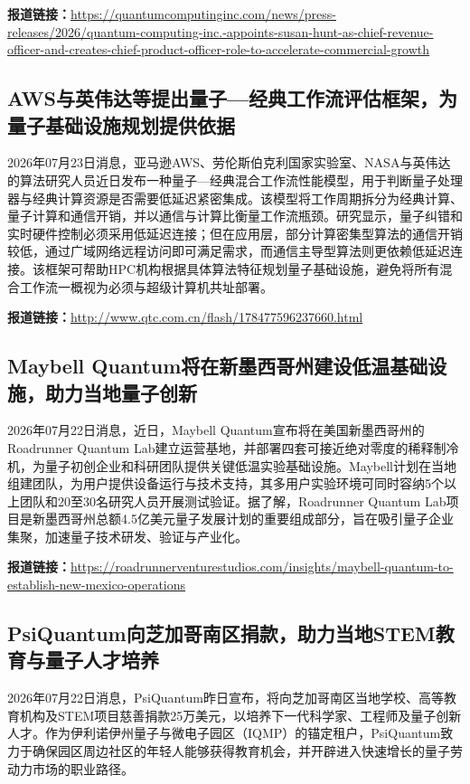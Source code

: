 \documentclass[12pt,a4paper]{ctexart}
\begin{document}
\noindent\textbf{报道链接：}\url{https://quantumcomputinginc.com/news/press-releases/2026/quantum-computing-inc.-appoints-susan-hunt-as-chief-revenue-officer-and-creates-chief-product-officer-role-to-accelerate-commercial-growth}

\subsection{ AWS与英伟达等提出量子—经典工作流评估框架，为量子基础设施规划提供依据 }

2026年07月23日消息，亚马逊AWS、劳伦斯伯克利国家实验室、NASA与英伟达的算法研究人员近日发布一种量子—经典混合工作流性能模型，用于判断量子处理器与经典计算资源是否需要低延迟紧密集成。该模型将工作周期拆分为经典计算、量子计算和通信开销，并以通信与计算比衡量工作流瓶颈。研究显示，量子纠错和实时硬件控制必须采用低延迟连接；但在应用层，部分计算密集型算法的通信开销较低，通过广域网络远程访问即可满足需求，而通信主导型算法则更依赖低延迟连接。该框架可帮助HPC机构根据具体算法特征规划量子基础设施，避免将所有混合工作流一概视为必须与超级计算机共址部署。

\noindent\textbf{报道链接：}\url{http://www.qtc.com.cn/flash/178477596237660.html}

\subsection{ Maybell Quantum将在新墨西哥州建设低温基础设施，助力当地量子创新 }

2026年07月22日消息，近日，Maybell Quantum宣布将在美国新墨西哥州的Roadrunner Quantum Lab建立运营基地，并部署四套可接近绝对零度的稀释制冷机，为量子初创企业和科研团队提供关键低温实验基础设施。Maybell计划在当地组建团队，为用户提供设备运行与技术支持，其多用户实验环境可同时容纳5个以上团队和20至30名研究人员开展测试验证。据了解，Roadrunner Quantum Lab项目是新墨西哥州总额4.5亿美元量子发展计划的重要组成部分，旨在吸引量子企业集聚，加速量子技术研发、验证与产业化。

\noindent\textbf{报道链接：}\url{https://roadrunnerventurestudios.com/insights/maybell-quantum-to-establish-new-mexico-operations}

\subsection{ PsiQuantum向芝加哥南区捐款，助力当地STEM教育与量子人才培养 }

2026年07月22日消息，PsiQuantum昨日宣布，将向芝加哥南区当地学校、高等教育机构及STEM项目慈善捐款25万美元，以培养下一代科学家、工程师及量子创新人才。作为伊利诺伊州量子与微电子园区（IQMP）的锚定租户，PsiQuantum致力于确保园区周边社区的年轻人能够获得教育机会，并开辟进入快速增长的量子劳动力市场的职业路径。
\end{document}

